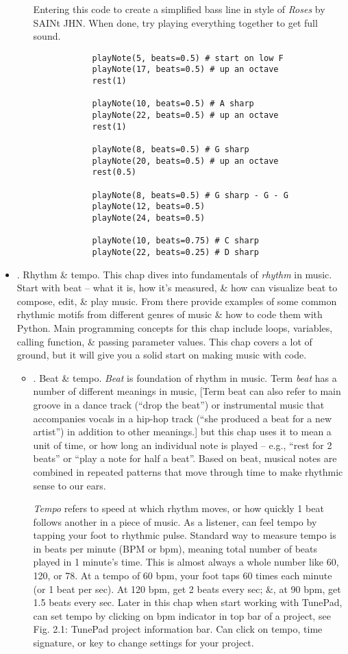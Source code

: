 \documentclass{article}
\begin{document}
\begin{itemize}
\begin{enumerate}
		Entering this code to create a simplified bass line in style of {\it Roses} by SAINt JHN. When done, try playing everything together to get full sound.
		\begin{verbatim}
			playNote(5, beats=0.5) # start on low F
			playNote(17, beats=0.5) # up an octave
			rest(1)
			
			playNote(10, beats=0.5) # A sharp
			playNote(22, beats=0.5) # up an octave
			rest(1)
			
			playNote(8, beats=0.5) # G sharp
			playNote(20, beats=0.5) # up an octave
			rest(0.5)
			
			playNote(8, beats=0.5) # G sharp - G - G
			playNote(12, beats=0.5)
			playNote(24, beats=0.5)
			
			playNote(10, beats=0.75) # C sharp
			playNote(22, beats=0.25) # D sharp
		\end{verbatim}
	\end{enumerate}	
	\item {. Rhythm \& tempo.} This chap dives into fundamentals of {\it rhythm} in music. Start with beat -- what it is, how it's measured, \& how can visualize beat to compose, edit, \& play music. From there provide examples of some common rhythmic motifs from different genres of music \& how to code them with Python. Main programming concepts for this chap include loops, variables, calling function, \& passing parameter values. This chap covers a lot of ground, but it will give you a solid start on making music with code.
	\begin{itemize}
		\item {. Beat \& tempo.} {\it Beat} is foundation of rhythm in music. Term {\it beat} has a number of different meanings in music, [Term beat can also refer to main groove in a dance track (``drop the beat'') or instrumental music that accompanies vocals in a hip-hop track (``she produced a beat for a new artist'') in addition to other meanings.] but this chap uses it to mean a unit of time, or how long an individual note is played -- e.g., ``rest for 2 beats'' or ``play a note for half a beat''. Based on beat, musical notes are combined in repeated patterns that move through time to make rhythmic sense to our ears.
		
		{\it Tempo} refers to speed at which rhythm moves, or how quickly 1 beat follows another in a piece of music. As a listener, can feel tempo by tapping your foot to rhythmic pulse. Standard way to measure tempo is in beats per minute (BPM or bpm), meaning total number of beats played in 1 minute's time. This is almost always a whole number like 60, 120, or 78. At a tempo of 60 bpm, your foot taps 60 times each minute (or 1 beat per sec). At 120 bpm, get 2 beats every sec; \&, at 90 bpm, get 1.5 beats every sec. Later in this chap when start working with TunePad, can set tempo by clicking on bpm indicator in top bar of a project, see {\sf Fig. 2.1: TunePad project information bar. Can click on tempo, time signature, or key to change settings for your project.}
		

\end{itemize}
\end{itemize}
\end{document}
